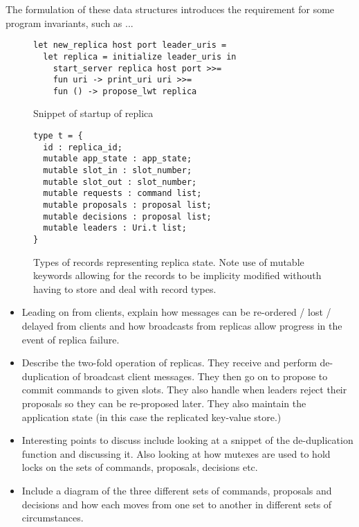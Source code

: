 The formulation of these data structures introduces the requirement for some program invariants, such as ... \\

\begin{figure}
  \begin{lstlisting}
let new_replica host port leader_uris =  
  let replica = initialize leader_uris in
    start_server replica host port >>=
    fun uri -> print_uri uri >>=
    fun () -> propose_lwt replica
  \end{lstlisting}
  \centering
  \caption{Snippet of startup of replica}
\end{figure}

\begin{figure}
\begin{lstlisting}
type t = {
  id : replica_id;
  mutable app_state : app_state;
  mutable slot_in : slot_number;
  mutable slot_out : slot_number;
  mutable requests : command list;
  mutable proposals : proposal list;
  mutable decisions : proposal list;
  mutable leaders : Uri.t list;
}
\end{lstlisting}
\centering
\caption{Types of records representing replica state. Note use of mutable keywords allowing for the records to be implicity modified withouth having to store and deal with record types.}
\end{figure}




\begin{itemize}
  \item Leading on from clients, explain how messages can be re-ordered / lost / delayed from clients and how broadcasts from replicas allow progress in the event of replica failure.
  \item Describe the two-fold operation of replicas. They receive and perform de-duplication of broadcast client messages. They then go on to propose to commit commands to given slots. They also handle when leaders reject their proposals so they can be re-proposed later. They also maintain the application state (in this case the replicated key-value store.)
  \item Interesting points to discuss include looking at a snippet of the de-duplication function and discussing it. Also looking at how mutexes are used to hold locks on the sets of commands, proposals, decisions etc.
  \item Include a diagram of the three different sets of commands, proposals and decisions and how each moves from one set to another in different sets of circumstances.
\end{itemize}

